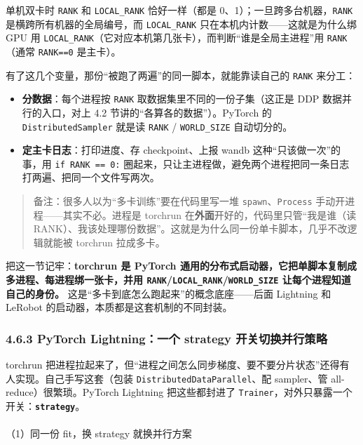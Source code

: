 \documentclass[
  chinese,
]{ctexart}
\makeatletter
\let\oldparagraph\paragraph
\renewcommand{\paragraph}{
    \@ifstar
      \xxxParagraphStar
      \xxxParagraphNoStar
  }
\newcommand{\xxxParagraphStar}[1]{\oldparagraph*{#1}\mbox{}}
\newcommand{\xxxParagraphNoStar}[1]{\oldparagraph{#1}\mbox{}}
\providecommand{\tightlist}{%
  \setlength{\itemsep}{0pt}\setlength{\parskip}{0pt}}
\makeatother
\begin{document}
单机双卡时 \texttt{RANK} 和 \texttt{LOCAL\_RANK} 恰好一样（都是
0、1）；一旦跨多台机器，\texttt{RANK} 是横跨所有机器的全局编号，而
\texttt{LOCAL\_RANK} 只在本机内计数------这就是为什么绑 GPU 用
\texttt{LOCAL\_RANK}（它对应本机第几张卡），而判断``谁是全局主进程''用
\texttt{RANK}（通常 \texttt{RANK==0} 是主卡）。

有了这几个变量，那份``被跑了两遍''的同一脚本，就能靠读自己的
\texttt{RANK} 来分工：

\begin{itemize}
\tightlist
\item
  \textbf{分数据}：每个进程按 \texttt{RANK}
  取数据集里不同的一份子集（这正是 DDP 数据并行的入口，对上 4.2
  节讲的``各算各的数据''）。PyTorch 的 \texttt{DistributedSampler}
  就是读 \texttt{RANK} / \texttt{WORLD\_SIZE} 自动切分的。
\item
  \textbf{定主卡日志}：打印进度、存 checkpoint、上报 wandb
  这种``只该做一次''的事，用 \texttt{if\ RANK\ ==\ 0:}
  圈起来，只让主进程做，避免两个进程把同一条日志打两遍、把同一个文件写两次。
\end{itemize}

\begin{quote}
备注：很多人以为``多卡训练''要在代码里写一堆
\texttt{spawn}、\texttt{Process} 手动开进程------其实不必。进程是
torchrun 在\textbf{外面}开好的，代码里只管``我是谁（读
RANK）、我该处理哪份数据''。这就是为什么同一份单卡脚本，几乎不改逻辑就能被
torchrun 拉成多卡。
\end{quote}

把这一节记牢：\textbf{torchrun 是 PyTorch
通用的分布式启动器，它把单脚本复制成多进程、每进程绑一张卡，并用
\texttt{RANK}/\texttt{LOCAL\_RANK}/\texttt{WORLD\_SIZE}
让每个进程知道自己的身份。}
这是``多卡到底怎么跑起来''的概念底座------后面 Lightning 和 LeRobot
的启动器，本质都是这套机制的不同封装。

\subsubsection{4.6.3 PyTorch Lightning：一个 strategy
开关切换并行策略}\label{pytorch-lightningux4e00ux4e2a-strategy-ux5f00ux5173ux5207ux6362ux5e76ux884cux7b56ux7565}

torchrun
把进程拉起来了，但``进程之间怎么同步梯度、要不要分片状态''还得有人实现。自己手写这套（包装
\texttt{DistributedDataParallel}、配 sampler、管
all-reduce）很繁琐。PyTorch Lightning 把这些都封进了
\texttt{Trainer}，对外只暴露一个开关：\textbf{\texttt{strategy}}。

\paragraph{（1）同一份 fit，换 strategy
就换并行方案}\label{ux540cux4e00ux4efd-fitux6362-strategy-ux5c31ux6362ux5e76ux884cux65b9ux6848}
\end{document}
